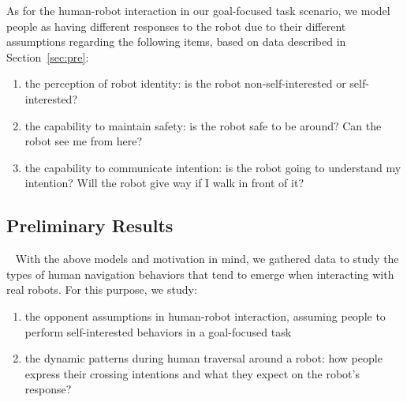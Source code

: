\documentclass[conference]{IEEEtran}
\begin{document}
As for the human-robot interaction in our goal-focused task scenario, we 
model people as having different responses to the robot due to their different 
assumptions regarding the following items, based on data described in Section~\ref{sec:pre}:
\begin{enumerate}
  \item the perception of robot identity: is the robot non-self-interested or self-interested?
  \item the capability to maintain safety: is the robot safe to be around? Can 
    the robot see me from here?
  \item the capability to communicate intention: is the robot going to 
    understand my intention? Will the robot give way if I walk in front of it?
\end{enumerate}




\vspace{-.3em}
\subsection{Preliminary Results}~\label{sec:pre}
With the above models and motivation in mind, we gathered data to study the types of human navigation behaviors that tend to emerge when interacting with real robots.
For this purpose, we study:
\begin{enumerate}
\item the opponent assumptions in human-robot interaction, assuming 
  people to perform self-interested behaviors in a goal-focused task
\item the dynamic patterns during human traversal around a robot: how people 
  express their crossing intentions and what they expect on the robot's 
  response?
\end{enumerate}
\end{document}
